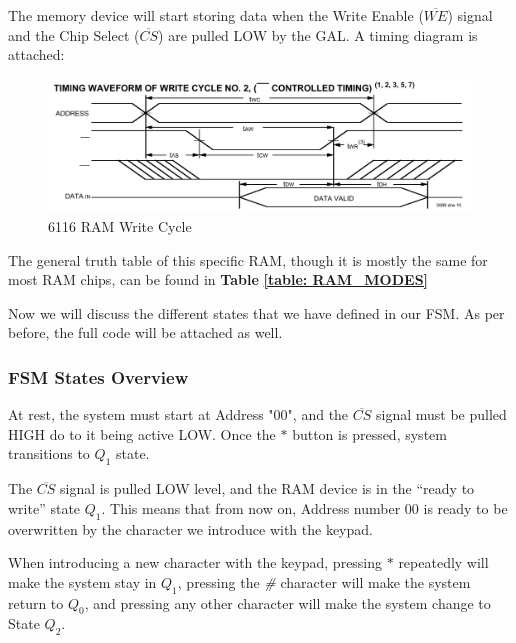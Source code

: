 \clearpage

The memory device will start storing data when the Write Enable ($\overline{WE}$) signal and the Chip Select ($\overline{CS}$) are pulled LOW by the GAL. A timing diagram is attached:\medskip


\begin{figure}[H]
    \centering
    \includegraphics[scale = 0.60]{Graphics/Practice 6/RAM/6116.pdf}
    \caption{6116 RAM Write Cycle ~\autocite{6116}}
    \label{fig:6116}
\end{figure}


The general truth table of this specific RAM, though it is mostly the same for most RAM chips, can be found in \textbf{Table} \textbf{\ref{table: RAM_MODES}} \medskip

Now we will discuss the different states that we have defined in our FSM. As per before, the full code will be attached as well.

\subsubsection{FSM States Overview}

\hspace{0.4cm}
\medskip

At rest, the system must start at Address "00", and the $\overline{CS}$ signal must be pulled HIGH do to it being active LOW. Once the $*$ button is pressed, system transitions to $Q_1$ state.

\medskip
\medskip

The $\overline{CS}$ signal is pulled LOW level, and the RAM device is in the “ready to write” state $Q_1$. This means that from now on, Address number $00$ is ready to be overwritten by the character we introduce with the keypad. \medskip

When introducing a new character with the keypad, pressing $*$ repeatedly will make the system stay in $Q_1$, pressing the \textit{\#} character will make the system return to $Q_0$, and pressing any other character will make the system change to State $Q_2$. \medskip


